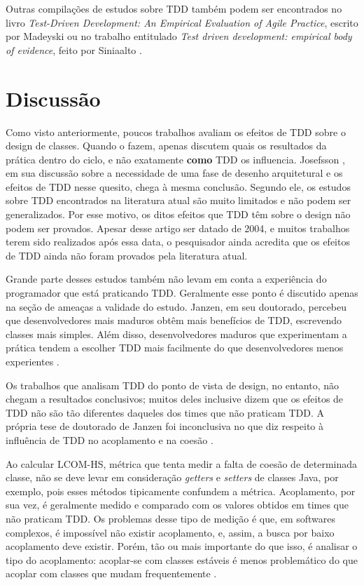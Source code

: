 Outras compilações de estudos sobre TDD também podem ser encontrados no livro
\textit{Test-Driven Development: An Empirical Evaluation of Agile Practice},
escrito por Madeyski \cite{madeyski-livro} ou no trabalho entitulado
\textit{Test driven development: empirical body of evidence}, feito por
Siniaalto \cite{tdd-body-of-evidence}.

\section{Discussão}

Como visto anteriormente, poucos trabalhos avaliam os efeitos de TDD sobre o
design de classes. Quando o fazem, apenas discutem quais os resultados da prática
dentro do ciclo, e não exatamente \textbf{como} TDD os influencia. Josefsson
\cite{josefsson}, em sua discussão sobre a necessidade de uma fase de desenho
arquitetural e os efeitos de TDD nesse quesito, chega à mesma conclusão. Segundo
ele, os estudos sobre TDD encontrados na literatura atual são muito limitados e
não podem ser generalizados. Por esse motivo, os ditos efeitos que TDD têm 
sobre o design não podem ser provados. Apesar desse artigo ser datado de 2004, e
muitos trabalhos terem sido realizados após essa data, o pesquisador ainda acredita 
que os efeitos de TDD ainda não foram provados pela literatura atual.

Grande parte desses estudos também não levam em conta a experiência do
programador que está praticando TDD. Geralmente esse ponto é discutido apenas 
na seção de ameaças a validade do estudo. Janzen, em seu doutorado, percebeu que
desenvolvedores mais maduros obtêm mais benefícios de TDD, escrevendo classes
mais simples. Além disso, desenvolvedores maduros que experimentam a prática
tendem a escolher TDD mais facilmente do que desenvolvedores menos experientes
\cite{janzen-phd}.

Os trabalhos que analisam TDD do ponto de vista de design, no entanto, não
chegam a resultados conclusivos; muitos deles inclusive dizem que os efeitos
de TDD não são tão diferentes daqueles dos times que não praticam TDD.  A própria tese de
doutorado de Janzen foi inconclusiva no que diz respeito à influência de TDD no 
acoplamento e na coesão \cite{janzen-phd}. 

Ao calcular LCOM-HS, métrica que tenta medir a falta de coesão de determinada
classe, não se deve levar em consideração \textit{getters} e \textit{setters} de
classes Java, por exemplo, pois esses métodos tipicamente confundem a métrica.
Acoplamento, por sua vez, é geralmente medido e comparado com os valores
obtidos em times que não praticam TDD. Os problemas desse tipo de medição é que,
em softwares complexos, é impossível não existir acoplamento, e, assim, a busca por
baixo acoplamento deve existir. Porém, tão ou mais importante do que isso, é
analisar o tipo do acoplamento: acoplar-se com classes estáveis é menos
problemático do que acoplar com classes que mudam frequentemente
\cite{bob-martin}. 

